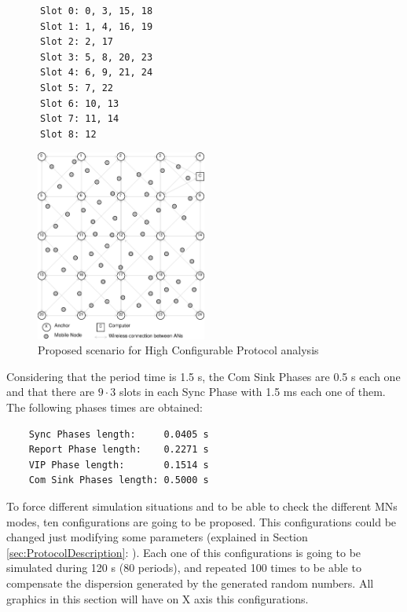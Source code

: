 \begin{verbatim}
      Slot 0: 0, 3, 15, 18
      Slot 1: 1, 4, 16, 19
      Slot 2: 2, 17
      Slot 3: 5, 8, 20, 23
      Slot 4: 6, 9, 21, 24
      Slot 5: 7, 22
      Slot 6: 10, 13
      Slot 7: 11, 14
      Slot 8: 12
\end{verbatim}

\begin{figure}[ht]
 \begin{center}
  \includegraphics[width=0.5\textwidth]{finalscenario.eps}
 \end{center}
 \caption{Proposed scenario for High Configurable Protocol analysis}
 \label{fig:finalscenario}
\end{figure}

Considering that the period time is 1.5 s, the Com Sink Phases are 0.5 s each one and that there are $9\cdot3$ slots in each Sync Phase with 1.5 ms each one
of them. The following phases times are obtained:

\begin{verbatim}
    Sync Phases length:     0.0405 s
    Report Phase length:    0.2271 s
    VIP Phase length:       0.1514 s
    Com Sink Phases length: 0.5000 s
\end{verbatim}

To force different simulation situations and to be able to check the different \acp{MN} modes, ten configurations are going to be proposed. This 
configurations could be changed just modifying some parameters (explained in Section \ref{sec:ProtocolDescription}: ). 
Each one of this configurations is going to be simulated during 120 s (80 periods), and repeated 100 times to be able to compensate the dispersion 
generated by the generated random numbers. All graphics in this section will have on X axis this configurations.

